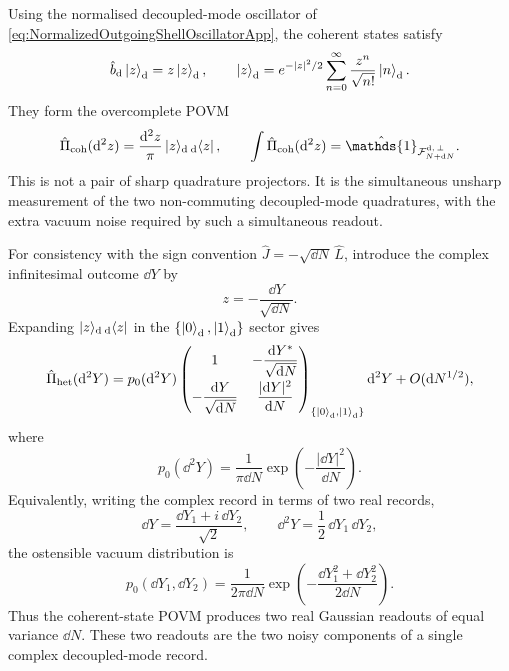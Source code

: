 \documentclass{article}
\def\cF{{\cal F}}
\newcommand{\openone}{\hat{\mathds{1}}}
\numberwithin{equation}{section}
\begin{document}
	Using the normalised decoupled-mode oscillator of \cref{eq:NormalizedOutgoingShellOscillatorApp}, the coherent states satisfy
	\begin{equation}
		\hat b_{\rm d}\ket{z}_{\rm d} = z\ket{z}_{\rm d}, \qquad \ket{z}_{\rm d} = e^{-|z|^2/2} \sum_{n=0}^{\infty} \frac{z^n}{\sqrt{n!}}\ket{n}_{\rm d} .
	\end{equation}
	They form the overcomplete POVM
	\begin{equation}
		\hat\Pi_{\rm coh}(\dd^2 z) = \frac{\dd^2 z}{\pi} \ket{z}\!{}_{\rm d}\,{}_{\rm d}\!\bra{z}, \qquad \int \hat\Pi_{\rm coh}(\dd^2 z)=\openone_{\cF^{\rm d,\,\perp}_{N+\dd N}}.
		\label{eq:CoherentPOVMFullApp}
	\end{equation}
	This is not a pair of sharp quadrature projectors. It is the simultaneous unsharp measurement of the two non-commuting decoupled-mode quadratures, with the extra vacuum noise required by such a simultaneous readout.

	For consistency with the sign convention \(\hat J=-\sqrt{\dd N}\,\hat L\), introduce the complex infinitesimal outcome \(\dd Y\) by
	\begin{equation}
		z=-\frac{\dd Y}{\sqrt{\dd N}} .
		\label{eq:CoherentOutcomeConventionApp}
	\end{equation}
	Expanding \(\ket{z}\!{}_{\rm d}\,{}_{\rm d}\!\bra{z}\) in the \(\{\ket{0}_{\rm d},\ket{1}_{\rm d}\}\) sector gives
	\begin{equation}
		\hat\Pi_{\rm het}(\dd^2 Y) = p_0(\dd^2 Y)
		\begin{pmatrix}
			1 & -\dfrac{\dd Y^*}{\sqrt{\dd N}} \\[8pt] -\dfrac{\dd Y}{\sqrt{\dd N}} & \dfrac{|\dd Y|^2}{\dd N}
		\end{pmatrix}_{\{\ket{0}_{\rm d},\ket{1}_{\rm d}\}}
		\dd^2 Y + O(\dd N^{1/2}),
		\label{eq:HeterodynePOVMBlockApp}
	\end{equation}
	where
	\begin{equation}
		p_0(\dd^2 Y) = \frac{1}{\pi \dd N} \exp\!\left( -\frac{|\dd Y|^2}{\dd N} \right).
		\label{eq:HeterodyneOstensibleApp}
	\end{equation}
	Equivalently, writing the complex record in terms of two real records,
	\begin{equation}
		\dd Y=\frac{\dd Y_1+i\,\dd Y_2}{\sqrt2}, \qquad \dd^2 Y=\frac12\,\dd Y_1\,\dd Y_2,
	\end{equation}
	the ostensible vacuum distribution is
	\begin{equation}
		p_0(\dd Y_1,\dd Y_2) = \frac{1}{2\pi \dd N} \exp\!\left( -\frac{\dd Y_1^2+\dd Y_2^2}{2\dd N} \right).
	\end{equation}
	Thus the coherent-state POVM produces two real Gaussian readouts of equal variance \(\dd N\). These two readouts are the two noisy components of a single complex decoupled-mode record.
\end{document}
